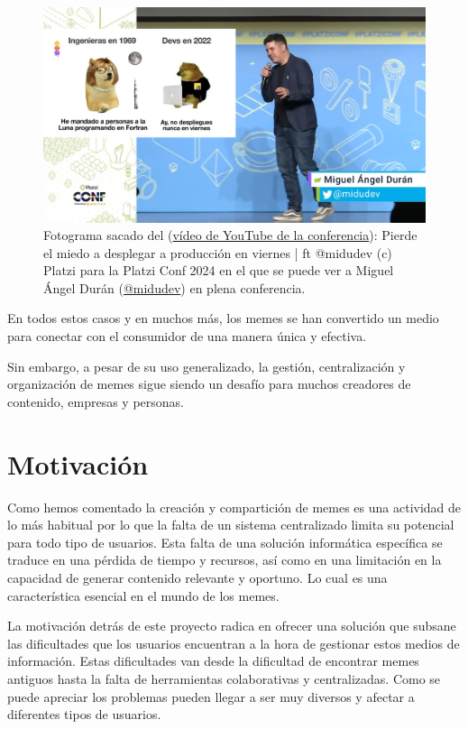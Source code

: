 \begin{figure}[ht]
    \caption{Fotograma sacado del (\href{http://sl.ugr.es/0dXQ}{vídeo de YouTube de la conferencia}): Pierde el miedo a desplegar a producción en viernes | ft @midudev (c) Platzi para la Platzi Conf 2024 en el que se puede ver a Miguel Ángel Durán (\href{https://midu.dev/}{@midudev}) en plena conferencia.}
    \centering
    \vspace*{0.5cm}
    \includegraphics[scale=0.15]{figuras/platziconfmidudev.png}
\end{figure}

En todos estos casos y en muchos más, los memes se han convertido un medio para conectar con el consumidor de una manera única y efectiva.

Sin embargo, a pesar de su uso generalizado, la gestión, centralización y organización de memes sigue siendo un desafío para muchos creadores de contenido, empresas y personas.

\section{Motivación}

Como hemos comentado la creación y compartición de memes es una actividad de lo más habitual por lo que la falta de un sistema centralizado limita su potencial para todo tipo de usuarios. Esta falta de una solución informática específica se traduce en una pérdida de tiempo y recursos, así como en una limitación en la capacidad de generar contenido relevante y oportuno. Lo cual es una característica esencial en el mundo de los memes.

La motivación detrás de este proyecto radica en ofrecer una solución que subsane las dificultades que los usuarios encuentran a la hora de gestionar estos medios de información. Estas dificultades van desde la dificultad de encontrar memes antiguos hasta la falta de herramientas colaborativas y centralizadas. Como se puede apreciar los problemas pueden llegar a ser muy diversos y afectar a diferentes tipos de usuarios.

